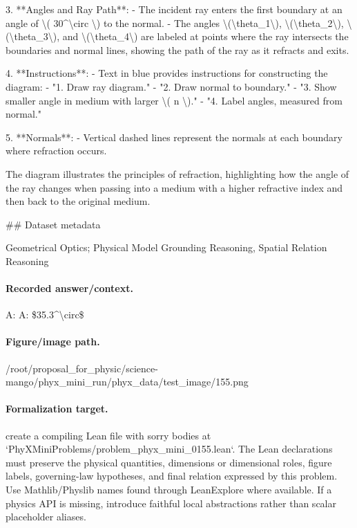 3. **Angles and Ray Path**:
   - The incident ray enters the first boundary at an angle of \textbackslash{}( 30\textasciicircum{}\textbackslash{}circ \textbackslash{}) to the normal.
   - The angles \textbackslash{}(\textbackslash{}theta\_1\textbackslash{}), \textbackslash{}(\textbackslash{}theta\_2\textbackslash{}), \textbackslash{}(\textbackslash{}theta\_3\textbackslash{}), and \textbackslash{}(\textbackslash{}theta\_4\textbackslash{}) are labeled at points where the ray intersects the boundaries and normal lines, showing the path of the ray as it refracts and exits.

4. **Instructions**:
   - Text in blue provides instructions for constructing the diagram:
     - "1. Draw ray diagram."
     - "2. Draw normal to boundary."
     - "3. Show smaller angle in medium with larger \textbackslash{}( n \textbackslash{})."
     - "4. Label angles, measured from normal."

5. **Normals**:
   - Vertical dashed lines represent the normals at each boundary where refraction occurs.

The diagram illustrates the principles of refraction, highlighting how the angle of the ray changes when passing into a medium with a higher refractive index and then back to the original medium.

\#\# Dataset metadata

Geometrical Optics; Physical Model Grounding Reasoning, Spatial Relation Reasoning

\paragraph{Recorded answer/context.}
A: A: \$35.3\textasciicircum{}\textbackslash{}circ\$

\paragraph{Figure/image path.}
/root/proposal\_for\_physic/science-mango/phyx\_mini\_run/phyx\_data/test\_image/155.png

\paragraph{Formalization target.}
create a compiling Lean file with sorry bodies at `PhyXMiniProblems/problem\_phyx\_mini\_0155.lean`. The Lean declarations must preserve the physical quantities, dimensions or dimensional roles, figure labels, governing-law hypotheses, and final relation expressed by this problem.
Use Mathlib/Physlib names found through LeanExplore where available. If a physics API is missing, introduce faithful local abstractions rather than scalar placeholder aliases.

